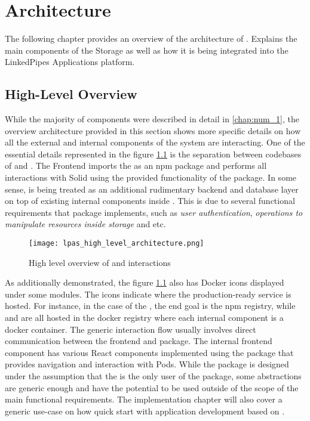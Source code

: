 \chapter{Architecture}
\label{chap:num_4}

The following chapter provides an overview of the architecture of \lpas. Explains the main components of the Storage as well as how it is being integrated into the LinkedPipes Applications platform.

\section{High-Level Overview}

While the majority of components were described in detail in \autoref{chap:num_1}, the overview architecture provided in this section shows more specific details on how all the external and internal components of the system are interacting. One of the essential details represented in the figure \ref{fig:lpas_high_level_architecture} is the separation between codebases of \lpa{} and \lpas{}. The \lpa{} Frontend imports the \lpas{} as an npm package and performs all interactions with Solid using the provided functionality of the package. In some sense, \lpas{} is being treated as an additional rudimentary backend and database layer on top of existing internal components inside \lpa{}. This is due to several functional requirements that \lpas{} package implements,  such as \textit{user authentication}, \textit{operations to manipulate resources inside storage} and etc.

\begin{figure}[h]
\centering
\texttt{[image: lpas\_high\_level\_architecture.png]}
\caption{High level overview of \lpa{} and \lpas{} interactions}
\label{fig:lpas_high_level_architecture}
\end{figure}

As additionally demonstrated, the figure \ref{fig:lpas_high_level_architecture} also has Docker icons displayed under some modules. The icons indicate where the production-ready service is hosted. For instance, in the case of the \lpas{}, the end goal is the npm registry, while \lps{} and \lpa{} are all hosted in the docker registry where each internal component is a docker container.
The generic interaction flow usually involves direct communication between the \lpa{} frontend and \lpas{} package. The internal frontend component has various React components implemented using the \lpas{} package that provides navigation and interaction with \solid{} Pods. While the package is designed under the assumption that the \lpa{} is the only user of the package, some abstractions are generic enough and have the potential to be used outside of the scope of the main functional requirements. The implementation chapter will also cover a generic use-case on how quick start with application development based on \solid{}.

